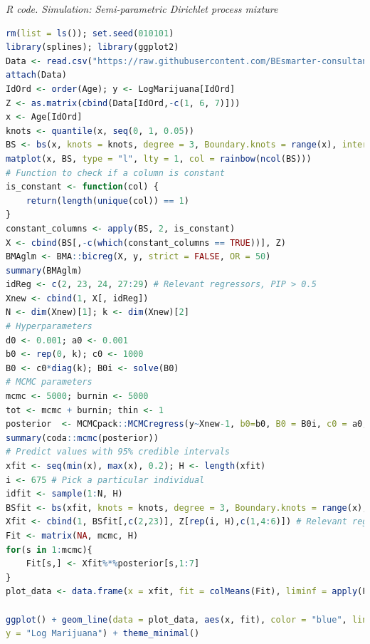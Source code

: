 \begin{enumerate}[leftmargin=*]
\begin{tcolorbox}[enhanced,width=4.67in,center upper,
	fontupper=\large\bfseries,drop shadow southwest,sharp corners]
	\textit{R code. Simulation: Semi-parametric Dirichlet process mixture}
	\begin{VF}
		\begin{lstlisting}[language=R]
rm(list = ls()); set.seed(010101) 
library(splines); library(ggplot2)
Data <- read.csv("https://raw.githubusercontent.com/BEsmarter-consultancy/BSTApp/refs/heads/master/DataApp/MarijuanaColombia.csv")
attach(Data)
IdOrd <- order(Age); y <- LogMarijuana[IdOrd]
Z <- as.matrix(cbind(Data[IdOrd,-c(1, 6, 7)]))
x <- Age[IdOrd] 
knots <- quantile(x, seq(0, 1, 0.05))
BS <- bs(x, knots = knots, degree = 3, Boundary.knots = range(x), intercept = FALSE)
matplot(x, BS, type = "l", lty = 1, col = rainbow(ncol(BS)))
# Function to check if a column is constant
is_constant <- function(col) {
	return(length(unique(col)) == 1)
}
constant_columns <- apply(BS, 2, is_constant)
X <- cbind(BS[,-c(which(constant_columns == TRUE))], Z)
BMAglm <- BMA::bicreg(X, y, strict = FALSE, OR = 50) 
summary(BMAglm)
idReg <- c(2, 23, 24, 27:29) # Relevant regressors, PIP > 0.5
Xnew <- cbind(1, X[, idReg])
N <- dim(Xnew)[1]; k <- dim(Xnew)[2]
# Hyperparameters
d0 <- 0.001; a0 <- 0.001
b0 <- rep(0, k); c0 <- 1000
B0 <- c0*diag(k); B0i <- solve(B0)
# MCMC parameters
mcmc <- 5000; burnin <- 5000
tot <- mcmc + burnin; thin <- 1
posterior  <- MCMCpack::MCMCregress(y~Xnew-1, b0=b0, B0 = B0i, c0 = a0, d0 = d0, burnin = burnin, mcmc = mcmc, thin = thin)
summary(coda::mcmc(posterior))
# Predict values with 95% credible intervals
xfit <- seq(min(x), max(x), 0.2); H <- length(xfit)
i <- 675 # Pick a particular individual
idfit <- sample(1:N, H)
BSfit <- bs(xfit, knots = knots, degree = 3, Boundary.knots = range(x), intercept = FALSE)
Xfit <- cbind(1, BSfit[,c(2,23)], Z[rep(i, H),c(1,4:6)]) # Relevant regressors, PIP > 0.5
Fit <- matrix(NA, mcmc, H)
for(s in 1:mcmc){
	Fit[s,] <- Xfit%*%posterior[s,1:7]
}
plot_data <- data.frame(x = xfit, fit = colMeans(Fit), liminf = apply(Fit, 2, quantile, 0.025), limsup = apply(Fit, 2, quantile, 0.975))

ggplot() + geom_line(data = plot_data, aes(x, fit), color = "blue", linewidth = 1) + geom_ribbon(data = plot_data, aes(x, ymin = liminf, ymax = limsup), fill = "blue", alpha = 0.2) + labs(title = "B-Spline Regression with 95% Confidence Interval", x = "Age",
y = "Log Marijuana") + theme_minimal()
\end{lstlisting}
	\end{VF}
\end{tcolorbox}


\end{enumerate}
